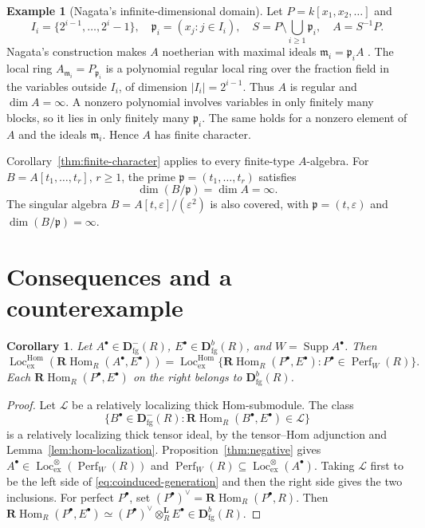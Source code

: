 \documentclass[11pt]{amsart}
\numberwithin{equation}{section}
\newtheorem{corollary}[theorem]{Corollary}
\theoremstyle{definition}
\newtheorem{example}[theorem]{Example}
\theoremstyle{remark}
\DeclareMathOperator{\Supp}{Supp}
\DeclareMathOperator{\Perf}{Perf}
\DeclareMathOperator{\Loc}{Loc}
\DeclareMathOperator{\Hom}{Hom}
\newcommand{\RHom}{\mathbf R\!\Hom}
\newcommand{\Lotimes}{\otimes_R^{\mathbf L}}
\newcommand{\D}{\mathbf D}
\newcommand{\fg}{\mathrm{fg}}
\newcommand{\Lten}{\Loc_{\mathrm{ex}}^{\otimes}}
\newcommand{\Lhom}{\Loc_{\mathrm{ex}}^{\Hom}}
\newcommand{\p}{\mathfrak p}
\newcommand{\m}{\mathfrak m}
\begin{document}
\begin{example}[Nagata's infinite-dimensional domain]\label{ex:nagata}
Let $P=k[x_1,x_2,\ldots]$ and
\[
 I_i=\{2^{i-1},\ldots,2^i-1\},\quad
 \p_i=(x_j:j\in I_i),\quad
 S=P\setminus\bigcup_{i\geq1}\p_i,\quad A=S^{-1}P.
\]
Nagata's construction makes $A$ noetherian with maximal ideals
$\m_i=\p_iA$ \cite[Section~110.16, Tag~02JC]{Stacks}.
The local ring $A_{\m_i}=P_{\p_i}$ is a polynomial regular local ring over
the fraction field in the variables outside $I_i$, of dimension
$|I_i|=2^{i-1}$. Thus $A$ is regular and $\dim A=\infty$.
A nonzero polynomial involves variables in only finitely many blocks,
so it lies in only finitely many $\p_i$. The same holds for a nonzero
element of $A$ and the ideals $\m_i$. Hence $A$ has finite character.

Corollary~\ref{thm:finite-character} applies to every finite-type
$A$-algebra. For $B=A[t_1,\ldots,t_r]$, $r\geq1$, the prime
$\p=(t_1,\ldots,t_r)$ satisfies
\[
 \dim(B/\p)=\dim A=\infty.
\]
The singular algebra $B=A[t,\varepsilon]/(\varepsilon^2)$ is also
covered, with $\p=(t,\varepsilon)$ and
$\dim(B/\p)=\infty$.
\end{example}

\section{Consequences and a counterexample}

\begin{corollary}\label{prop:coinduced}
Let $A^{\bullet}\in\D^-_{\fg}(R)$, $E^{\bullet}\in\D^b_{\fg}(R)$, and $W=\Supp A^{\bullet}$. Then
\begin{equation}\label{eq:coinduced-generation}
 \Lhom(\RHom_R(A^{\bullet},E^{\bullet}))=
 \Lhom\{\RHom_R(P^{\bullet},E^{\bullet}):P^{\bullet}\in\Perf_W(R)\}.
\end{equation}
Each $\RHom_R(P^{\bullet},E^{\bullet})$ on the right belongs to $\D^b_{\fg}(R)$.
\end{corollary}
\begin{proof}
Let $\mathcal L$ be a relatively localizing thick Hom-submodule. The class
\[
 \{B^{\bullet}\in\D^-_{\fg}(R):\RHom_R(B^{\bullet},E^{\bullet})\in\mathcal L\}
\]
is a relatively localizing thick tensor ideal, by the tensor--Hom
adjunction and Lemma~\ref{lem:hom-localization}.
Proposition~\ref{thm:negative} gives
$A^{\bullet}\in\Lten(\Perf_W(R))$ and
$\Perf_W(R)\subseteq\Lten(A^{\bullet})$. Taking $\mathcal L$ first to be the left side of
\eqref{eq:coinduced-generation} and then the right side gives
the two inclusions.
For perfect $P^{\bullet}$, set $(P^{\bullet})^\vee=\RHom_R(P^{\bullet},R)$. Then
$\RHom_R(P^{\bullet},E^{\bullet})\simeq (P^{\bullet})^\vee\Lotimes E^{\bullet}\in\D^b_{\fg}(R)$.
\end{proof}
\end{document}
